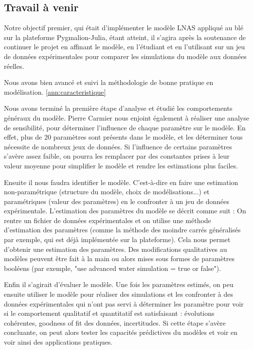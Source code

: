 \subsection{Travail à venir}
Notre objectif premier, qui était d'implémenter le modèle LNAS appliqué au blé sur la plateforme Pygmalion-Julia, étant atteint, il s'agira après la soutenance de continuer le projet en affinant le modèle, en l'étudiant et en l'utilisant sur un jeu de données expérimentales pour comparer les simulations du modèle aux données réelles.

Nous avons bien avancé et suivi la méthodologie de bonne pratique en modélisation. \ref{ann:caracteristique}

Nous avons terminé la première étape d'analyse et étudié les comportements généraux du modèle.
Pierre Carmier nous enjoint également à réaliser une analyse de sensibilité, pour déterminer l'influence de chaque paramètre sur le modèle. En effet, plus de 20 paramètres sont présents dans le modèle, et les déterminer tous nécessite de nombreux jeux de données. Si l'influence de certains paramètres s'avère assez faible, on pourra les remplacer par des constantes prises à leur valeur moyenne pour simplifier le modèle et rendre les estimations plus faciles.

Ensuite il nous faudra identifier le modèle. C'est-à-dire en faire une estimation non-paramétrique (structure du modèle, choix de modélisations...) et paramétriques (valeur des paramètres) en le confronter à un jeu de données expérimentale. L'estimation des paramètres du modèle se décrit comme suit : On rentre un fichier de données expérimentales et on utilise une méthode d'estimation des paramètres (comme la méthode des moindre carrés généralisés par exemple, qui est déjà implémentée sur la plateforme). Cela nous permet d'obtenir une estimation des paramètres. Des modifications qualitatives au modèles peuvent être fait à la main ou alors mises sous formes de paramètres booléens (par exemple, "use advanced water simulation = true or false").

Enfin il s'agirait d'évaluer le modèle. Une fois les paramètres estimés, on peu ensuite utiliser le modèle pour réaliser des simulations et les confronter à des données expérimentales qui n'ont pas servi à déterminer les paramètre pour voir si le comportement qualitatif et quantitatif est satisfaisant : évolutions cohérentes, goodness of fit des données, incertitudes.
Si cette étape s'avère concluante, on peut alors tester les capacités prédictives du modèles et voir en voir ainsi des applications pratiques.

